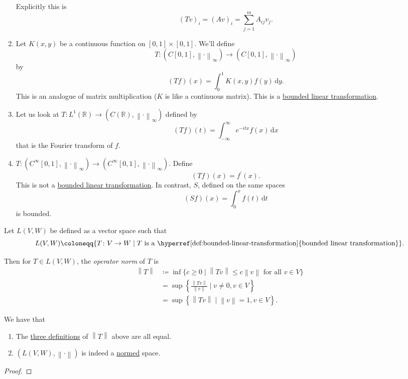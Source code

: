 \begin{eg}
\begin{enumerate}
		      Explicitly this is
		      \[
			      (Tv)_i = (Av)_i = \sum_{j=1}^m A_{ij}v_j.
		      \]
		\item Let \(K(x,y)\) be a continuous function on \([0,1] \times [0,1]\). We'll define
		      \[
			      T \colon (C[0,1],\left\lVert \cdot\right\rVert _\infty) \to (C[0,1], \left\lVert \cdot\right\rVert _\infty)
		      \]
		      by
		      \[
			      (Tf)(x) = \int_0^1 K(x,y)f(y) \,\mathrm{d} y.
		      \]
		      This is an analogue of matrix multiplication ($K$ is like a continuous matrix). This is a \hyperref[def:bounded-linear-transformation]{bounded linear transformation}.
		\item Let us look at \(T \colon L^1(\mathbb{R}) \to (C(\mathbb{R}),\left\lVert \cdot\right\rVert _\infty)\) defined by
		      \[
			      (Tf)(t) = \int_{-\infty}^\infty e^{-itx}f(x) \,\mathrm{d} x
		      \]
		      that is the Fourier transform of \(f\).
		\item $T : (C^\infty[0,1],\left\lVert \cdot\right\rVert _\infty) \to (C^\infty[0,1], \left\lVert \cdot\right\rVert _\infty)$. Define
		      \[
			      (Tf)(x) = f^\prime (x).
		      \]
		      This is not a \hyperref[def:bounded-linear-transformation]{bounded linear transformation}. In contrast, \(S\), defined on the same spaces
		      \[
			      (Sf)(x) = \int_0^x f(t) \,\mathrm{d} t
		      \]
		      is bounded.
	\end{enumerate}
\end{eg}

\begin{definition}\label{def:operator-norm}
	Let \(L(V, W)\) be defined as a vector space such that
	\[
		L(V,W) \coloneqq \{T \colon V \to W \mid T \text{ is a \hyperref[def:bounded-linear-transformation]{bounded linear transformation}}\}.
	\]

	Then for \(T \in L(V,W)\), the \emph{operator norm} of \(T\) is
	\[
		\begin{split}
			\left\lVert T\right\rVert & \coloneqq \inf\{c \geq 0 \mid \left\lVert Tv\right\rVert \leq c\left\lVert v\right\rVert \text{ for all } v \in V\} \\
			& = \sup\left\{ \frac{\left\lVert Tv\right\rVert}{\left\lVert v\right\rVert} \mid v \neq 0, v \in V\right\}           \\
			& = \sup\left\{ \left\lVert Tv\right\rVert \mid \left\lVert v\right\rVert = 1, v \in V\right\}.
		\end{split}
	\]
\end{definition}

\begin{lemma}
	We have that
	\begin{enumerate}
		\item The \hyperref[def:operator-norm]{three definitions} of \(\left\lVert T\right\rVert\) above are all equal.
		\item \((L(V,W), \left\lVert \cdot\right\rVert )\) is indeed a \hyperref[def:norm]{normed} space.
	\end{enumerate}
\end{lemma}
\begin{proof}
\end{proof}
